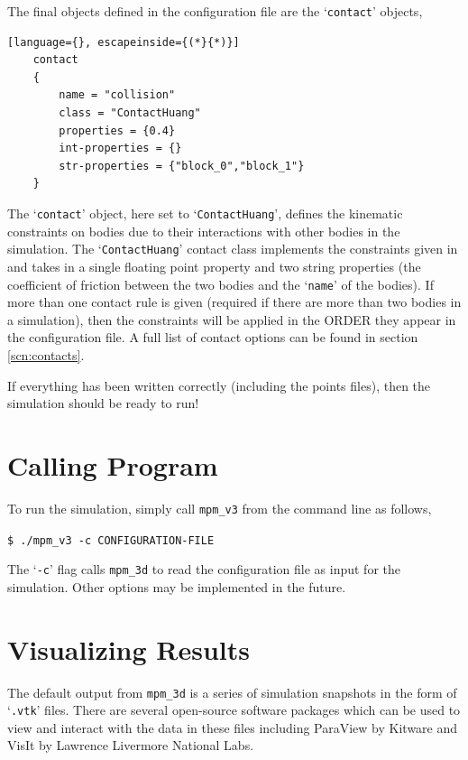 The final objects defined in the configuration file are the `\texttt{contact}' objects,
\begin{lstlisting}[language={}, escapeinside={(*}{*)}]
    contact
    {
        name = "collision"
        class = "ContactHuang"
        properties = {0.4}
        int-properties = {}
        str-properties = {"block_0","block_1"}
    }
\end{lstlisting}
The `\texttt{contact}' object, here set to `\texttt{ContactHuang}', defines the kinematic constraints on bodies due to their interactions with other bodies in the simulation. The `\texttt{ContactHuang}' contact class implements the constraints given in \cite{huang2011} and takes in a single floating point property and two string properties (the coefficient of friction between the two bodies and the `\texttt{name}' of the bodies). If more than one contact rule is given (required if there are more than two bodies in a simulation), then the constraints will be applied in the ORDER they appear in the configuration file. A full list of contact options can be found in section \ref{scn:contacts}.

If everything has been written correctly (including the points files), then the simulation should be ready to run!

\section{Calling Program}
To run the simulation, simply call \texttt{mpm\_v3} from the command line as follows,

\texttt{\$ ./mpm\_v3 -c CONFIGURATION-FILE}

The `\texttt{-c}' flag calls \texttt{mpm\_3d} to read the configuration file as input for the simulation. Other options may be implemented in the future.


\section{Visualizing Results}
The default output from \texttt{mpm\_3d} is a series of simulation snapshots in the form of `\texttt{.vtk}' files. There are several open-source software packages which can be used to view and interact with the data in these files including ParaView by Kitware and VisIt by Lawrence Livermore National Labs.